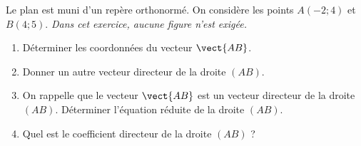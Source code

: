 \documentclass[a4paper]{article}
\begin{document}
\smallskip

\exo[5 points] Le plan est muni d'un repère orthonormé. On considère les points $A(-2;4)$ et $B(4;5)$. \textit{Dans cet exercice, aucune figure n'est exigée.}
\begin{enumerate}
  \item Déterminer les coordonnées du vecteur $\vect{AB}$.
  \item Donner un autre vecteur directeur de la droite $(AB)$.
  \item On rappelle que le vecteur $\vect{AB}$ est un vecteur directeur de la droite $(AB)$. Déterminer l'équation réduite de la droite $(AB)$.
  \item Quel est le coefficient directeur de la droite $(AB)$ ?
\end{enumerate}
\end{document}

